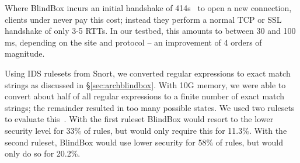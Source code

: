  Where BlindBox incurs an initial handshake of 414s~\cite{blindbox} to open a new connection, clients under \sys never pay this cost; instead they perform a normal TCP or SSL handshake of only 3-5 RTTs. In our testbed, this amounts to between 30 and 100 ms, depending on the site and protocol -- an improvement of 4 orders of magnitude.

Using IDS rulesets from Snort, we converted regular expressions to exact match strings as discussed in \S\ref{sec:archblindbox}. With 10G memory, we were able to convert about half of all regular expressions to a finite number of exact match strings; the remainder resulted in too many possible states. 
We used two rulesets to evaluate this~\cite{emergingthreats, snort-community}. With the first ruleset BlindBox would resort to the lower security level for 33\% of rules, but \sys would only require this for 11.3\%.
With the second ruleset, BlindBox would use lower security for 58\% of rules, but \sys would only do so for 20.2\%.


